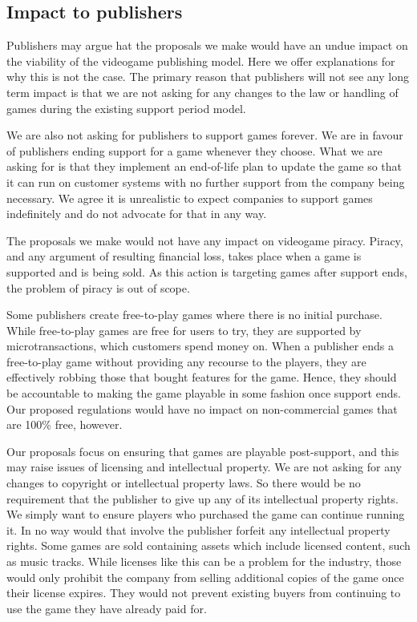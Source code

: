 \subsection{Impact to publishers}
Publishers may argue hat the proposals we make would have an undue impact on the viability of the videogame publishing model.
Here we offer explanations for why this is not the case.
The primary reason that publishers will not see any long term impact is that we are not asking for any changes to the law or handling of games during the existing support period model.

We are also not asking for publishers to support games forever.
We are in favour of publishers ending support for a game whenever they choose.
What we are asking for is that they implement an end-of-life plan to \gls{update} the game
so that it can run on customer systems with no further support from the company being necessary.
We agree it is unrealistic to expect companies to support games indefinitely and do not advocate for that in any way.

The proposals we make would not have any impact on videogame piracy.
Piracy, and any argument of resulting financial loss, takes place when a game is supported and is being sold\cn.
As this action is targeting games after support ends, the problem of piracy is out of scope.

Some publishers create free-to-play games where there is no initial purchase.
While free-to-play games are free for users to try, they are supported by microtransactions, which customers spend money on\cn.
When a publisher ends a free-to-play game without providing any recourse to the players, they are effectively robbing those that bought features for the game.
Hence, they should be accountable to making the game playable in some fashion once support ends.
Our proposed regulations would have no impact on non-commercial games that are 100\% free, however.

Our proposals focus on ensuring that games are playable post-support, and this may raise issues of licensing and intellectual property.
We are not asking for any changes to copyright or intellectual property laws.
So there would be no requirement that the publisher to give up any of its intellectual property rights.
We simply want to ensure players who purchased the game can continue running it.
In no way would that involve the publisher forfeit any intellectual property rights.
Some games are sold containing \glspl{asset} which include licensed content, such as music tracks.
While licenses like this can be a problem for the industry, those would only prohibit the company from selling additional copies of the game once their license expires.
They would not prevent existing buyers from continuing to use the game they have already paid for.

